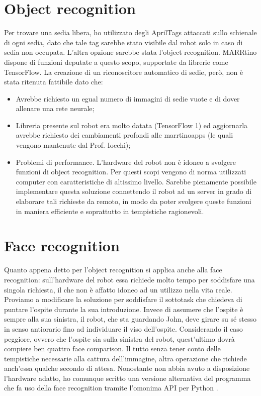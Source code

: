\documentclass[italian, twoside]{sapthesis} %
\begin{document}
\section{Object recognition}
Per trovare una sedia libera, ho utilizzato degli AprilTags attaccati sullo schienale di ogni sedia, dato che tale tag sarebbe stato visibile dal robot solo in caso di sedia non occupata. L’altra opzione sarebbe stata l’object recognition. MARRtino dispone di funzioni deputate a questo scopo, supportate da librerie come TensorFlow. La creazione di un riconoscitore automatico di sedie, però, non è stata ritenuta fattibile dato che:
\begin{itemize}
    \item Avrebbe richiesto un egual numero di immagini di sedie vuote e di dover allenare una rete neurale;
    \item Libreria presente sul robot era molto datata (TensorFlow 1) ed aggiornarla avrebbe richiesto dei cambiamenti profondi alle marrtinoapps (le quali vengono mantenute dal Prof. Iocchi);
    \item Problemi di performance. L'hardware del robot non è idoneo a svolgere funzioni di object recognition. Per questi scopi vengono di norma utilizzati computer con caratteristiche di altissimo livello. Sarebbe pienamente possibile implementare questa soluzione connettendo il robot ad un server in grado di elaborare tali richieste da remoto, in modo da poter svolgere queste funzioni in maniera efficiente e soprattutto in tempistiche ragionevoli.
\end{itemize}

\section{Face recognition}
Quanto appena detto per l'object recognition si applica anche alla face recognition: sull'hardware del robot essa richiede molto tempo per soddisfare una singola richiesta, il che non è affatto idoneo ad un utilizzo nella vita reale. Proviamo a modificare la soluzione per soddisfare il sottotask che chiedeva di puntare l'ospite durante la sua introduzione. Invece di assumere che l'ospite è sempre alla sua sinistra, il robot, che sta guardando John, deve girare su sé stesso in senso antiorario fino ad individuare il viso dell'ospite. Considerando il caso peggiore, ovvero che l'ospite sia sulla sinistra del robot, quest'ultimo dovrà compiere ben quattro face comparison. Il tutto senza tener conto delle tempistiche necessarie alla cattura dell'immagine, altra operazione che richiede anch'essa qualche secondo di attesa. Nonostante non abbia avuto a disposizione l'hardware adatto, ho comunque scritto una versione alternativa del programma che fa uso della face recognition tramite l'omonima API per Python \cite{geitgey2017recognition}.
\end{document}

